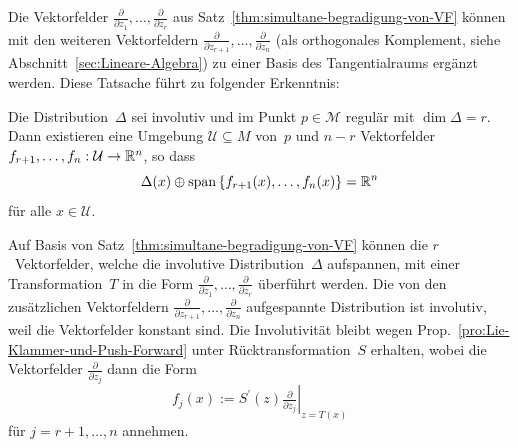 Die Vektorfelder $\tfrac{\partial}{\partial z_{1}},\ldots,\tfrac{\partial}{\partial z_{r}}$
aus Satz~\ref{thm:simultane-begradigung-von-VF} können mit den weiteren
Vektor\-feldern $\tfrac{\partial}{\partial z_{r+1}},\ldots,\tfrac{\partial}{\partial z_{n}}$
(als orthogonales Komplement, siehe
Abschnitt~\ref{sec:Lineare-Algebra}) zu einer Basis des Tangentialraums
ergänzt werden. Diese Tatsache führt zu folgender Erkenntnis:
\begin{corollary}
\label{cor:ergaenzung-einer-involutiven-distribution}Die Distribution~$\Delta$
sei involutiv und im Punkt $p\in\mathcal{M}$ regulär mit $\dim\Delta=r$.
Dann existieren eine Umgebung $\mathcal{U}\subseteq M$ von~$p$
und $n-r$ Vektorfelder $f_{r+1},\ldots,f_{n}:\mathcal{U}\to{\mathbb{R}}^{n}$,
so dass
\[
\Delta(x)\oplus{\operatorname{span}}\left\{ f_{r+1}(x),\ldots,f_{n}(x)\right\} ={\mathbb{R}}^{n}
\]
für alle $x\in\mathcal{U}$.
\end{corollary}
\begin{svmultproof2}
Auf Basis von Satz~\ref{thm:simultane-begradigung-von-VF} können
die $r$~Vektorfelder, welche die involutive Distribution~$\Delta$
aufspannen, mit einer Transformation~$T$ in die Form $\tfrac{\partial}{\partial z_{1}},\ldots,\tfrac{\partial}{\partial z_{r}}$
überführt werden. Die von den zusätzlichen Vektorfeldern $\tfrac{\partial}{\partial z_{r+1}},\ldots,\tfrac{\partial}{\partial z_{n}}$
aufgespannte Distribution ist involutiv, weil die Vektorfelder konstant
sind. Die Involutivität bleibt wegen Prop.~\ref{pro:Lie-Klammer-und-Push-Forward}
unter Rücktransformation~$S$ erhalten, wobei die Vektor\-felder
$\tfrac{\partial}{\partial z_{j}}$ dann die Form 
\[
f_{j}(x):=\left.S^{\prime}(z)\tfrac{\partial}{\partial z_{j}}\right|_{z=T(x)}
\]
 für $j=r+1,\ldots,n$ annehmen.
\end{svmultproof2}

